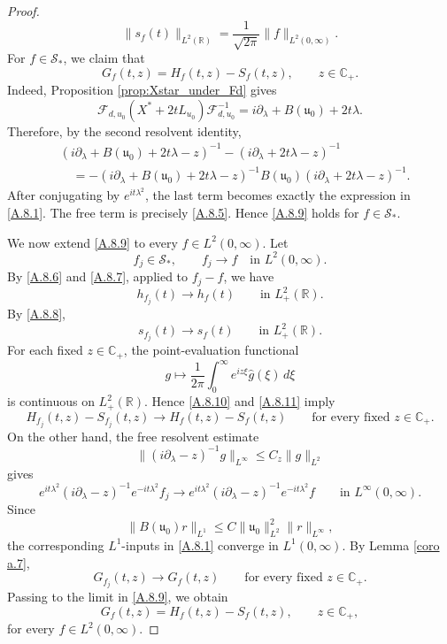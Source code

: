 \documentclass[10pt]{article}
\numberwithin{equation}{section}
\numberwithin{theorem}{section}
\begin{document}
\begin{appendix}
\begin{proof}
\begin{equation}
\|s_f(t)\|_{L^2(\mathbb R)}
=
\frac{1}{\sqrt{2\pi}}\|f\|_{L^2(0,\infty)}.
\end{equation}
For \(f\in\mathcal S_*\), we claim that
\begin{equation}
\label{A.8.9}
G_f(t,z)
=
H_f(t,z)-S_f(t,z),
\qquad z\in\mathbb C_+.
\end{equation}
Indeed, Proposition \ref{prop:Xstar_under_Fd} gives
\[
\mathcal F_{d,u_0}
\left(X^*+2tL_{u_0}\right)
\mathcal F_{d,u_0}^{-1}
=
i\partial_\lambda+B(\mathfrak u_0)+2t\lambda .
\]
Therefore, by the second resolvent identity,
\[
\begin{aligned}
&\left(i\partial_\lambda+B(\mathfrak u_0)+2t\lambda-z\right)^{-1}
-
\left(i\partial_\lambda+2t\lambda-z\right)^{-1}  \\
&\quad =
-
\left(i\partial_\lambda+B(\mathfrak u_0)+2t\lambda-z\right)^{-1}
B(\mathfrak u_0)
\left(i\partial_\lambda+2t\lambda-z\right)^{-1}.
\end{aligned}
\]
After conjugating by \(e^{it\lambda^2}\), the last term becomes exactly the expression in
\eqref{A.8.1}. The free term is precisely \eqref{A.8.5}. Hence \eqref{A.8.9} holds for
\(f\in\mathcal S_*\).

We now extend \eqref{A.8.9} to every \(f\in L^2(0,\infty)\). Let
\[
f_j\in\mathcal S_*,
\qquad
f_j\to f
\quad\text{in }L^2(0,\infty).
\]
By \eqref{A.8.6} and \eqref{A.8.7}, applied to \(f_j-f\), we have
\begin{equation}
\label{A.8.10}
h_{f_j}(t)\to h_f(t)
\qquad\text{in }L^2_+(\mathbb R).
\end{equation}
By \eqref{A.8.8},
\begin{equation}
\label{A.8.11}
s_{f_j}(t)\to s_f(t)
\qquad\text{in }L^2_+(\mathbb R).
\end{equation}
For each fixed \(z\in\mathbb C_+\), the point-evaluation functional
\[
g\mapsto
\frac1{2\pi}\int_0^\infty e^{iz\xi}\widehat g(\xi)\,d\xi
\]
is continuous on \(L^2_+(\mathbb R)\). Hence \eqref{A.8.10} and \eqref{A.8.11} imply
\[
H_{f_j}(t,z)-S_{f_j}(t,z)
\longrightarrow
H_f(t,z)-S_f(t,z)
\qquad\text{for every fixed }z\in\mathbb C_+.
\]
On the other hand, the free resolvent estimate
\[
\|(i\partial_\lambda-z)^{-1}g\|_{L^\infty}
\le
C_z\|g\|_{L^2}
\]
gives
\[
e^{it\lambda^2}(i\partial_\lambda-z)^{-1}e^{-it\lambda^2}f_j
\to
e^{it\lambda^2}(i\partial_\lambda-z)^{-1}e^{-it\lambda^2}f
\qquad\text{in }L^\infty(0,\infty).
\]
Since
\[
\|B(\mathfrak u_0)r\|_{L^1}
\le
C\|\mathfrak u_0\|_{L^2}^2\|r\|_{L^\infty},
\]
the corresponding \(L^1\)-inputs in \eqref{A.8.1} converge in \(L^1(0,\infty)\). By
Lemma \ref{coro a.7},
\[
G_{f_j}(t,z)\to G_f(t,z)
\qquad\text{for every fixed }z\in\mathbb C_+.
\]
Passing to the limit in \eqref{A.8.9}, we obtain
\begin{equation}
\label{A.8.12}
G_f(t,z)
=
H_f(t,z)-S_f(t,z),
\qquad z\in\mathbb C_+,
\end{equation}
for every \(f\in L^2(0,\infty)\).


\end{proof}
\end{appendix}
\end{document}
